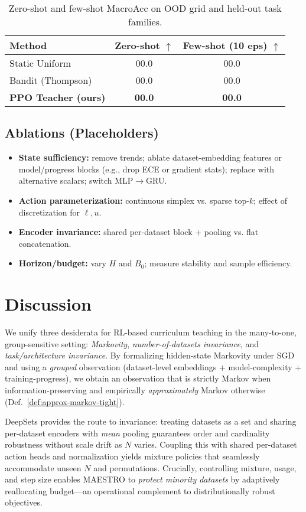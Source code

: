 \documentclass[11pt]{article}
\newcommand{\1}{\mathbf{1}}
\newcommand{\MAESTRO}{\textsc{MAESTRO}\xspace}
\begin{document}
\begin{table}[H]
\centering
\caption{Zero-shot and few-shot MacroAcc on OOD grid and held-out task families.}
\label{tab:ood}
\begin{tabular}{lcc}
\toprule
Method & Zero-shot $\uparrow$ & Few-shot (10 eps) $\uparrow$ \\
\midrule
Static Uniform & 00.0 & 00.0 \\
Bandit (Thompson) & 00.0 & 00.0 \\
\textbf{PPO Teacher (ours)} & \textbf{00.0} & \textbf{00.0} \\
\bottomrule
\end{tabular}
\end{table}

\subsection{Ablations (Placeholders)}
\begin{itemize}[leftmargin=1.5em]
\item \textbf{State sufficiency:} remove trends; ablate dataset-embedding features or model/progress blocks (e.g., drop ECE or gradient stats); replace with alternative scalars; switch MLP$\to$GRU.
\item \textbf{Action parameterization:} continuous simplex vs. sparse top-$k$; effect of discretization for $\ell,u$.
\item \textbf{Encoder invariance:} shared per-dataset block + pooling vs. flat concatenation.
\item \textbf{Horizon/budget:} vary $H$ and $B_0$; measure stability and sample efficiency.
\end{itemize}

\section{Discussion}
We unify three desiderata for RL-based curriculum teaching in the many-to-one, group-sensitive setting: \emph{Markovity}, \emph{number-of-datasets invariance}, and \emph{task/architecture invariance}. By formalizing hidden-state Markovity under SGD and using a \emph{grouped} observation (dataset-level embeddings + model-complexity + training-progress), we obtain an observation that is strictly Markov when information-preserving and empirically \emph{approximately} Markov otherwise (Def.~\ref{def:approx-markov-tight}). 

DeepSets provides the route to invariance: treating datasets as a set and sharing per-dataset encoders with \emph{mean} pooling guarantees order and cardinality robustness without scale drift as $N$ varies. Coupling this with shared per-dataset action heads and normalization yields mixture policies that seamlessly accommodate unseen $N$ and permutations. Crucially, controlling mixture, usage, and step size enables \MAESTRO{} to \emph{protect minority datasets} by adaptively reallocating budget—an operational complement to distributionally robust objectives.
\end{document}
